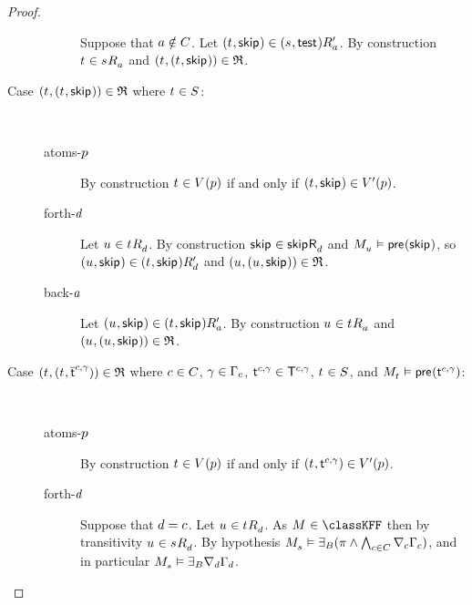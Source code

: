 \begin{proof}
\begin{description}
\begin{description}
                Suppose that $\agentA \notin \agentsC$.
                Let $(\kStateT, \aStateSkip) \in \kSuccessorsPA{(\kStateS, \aStateTest)}$.
                By construction $\kStateT \in \kSuccessorsA{\kStateS}$ and $(\kStateT, (\kStateT, \aStateSkip)) \in \refinement$.
        \end{description}
    \item[{Case $(\kStateT, (\kStateT, \aStateSkip)) \in \refinement$ where $\kStateT \in \kStates$:}] \hfill \\
        \begin{description}
            \item[atoms-$\atomP$]
                By construction $\kStateT \in \kValuation(\atomP)$ if and only if $(\kStateT, \aStateSkip) \in \kValuationP(\atomP)$.
            \item[forth-$\agentD$]
                Let $\kStateU \in \kSuccessorsD{\kStateT}$.
                By construction $\aStateSkip \in \aSuccessorsD{\aStateSkip}$ and $\kPModel{\kStateU} \entails \aPrecondition(\aStateSkip)$, so $(\kStateU, \aStateSkip) \in \kSuccessorsPD{(\kStateT, \aStateSkip)}$ and $(\kStateU, (\kStateU, \aStateSkip)) \in \refinement$.
            \item[back-$\agentA$]
                Let $(\kStateU, \aStateSkip) \in \kSuccessorsPA{(\kStateT, \aStateSkip)}$.
                By construction $\kStateU \in \kSuccessorsA{\kStateT}$ and $(\kStateU, (\kStateU, \aStateSkip)) \in \refinement$.
        \end{description}
    \item[{Case $(\kStateT, (\kStateT, \aPStateT[\agentC, \gamma])) \in \refinement$ where $\agentC \in \agentsC$, $\gamma \in \Gamma_\agentC$, $\aStateT[\agentC, \gamma] \in \aStatesT[\agentC, \gamma]$, $\kStateT \in \kStates$, and $\kPModel{\kStateT} \entails \aPrecondition(\aStateT[\agentC, \gamma])$:}] \hfill \\
        \begin{description}
            \item[atoms-$\atomP$]
                By construction $\kStateT \in \kValuation(\atomP)$ if and only if $(\kStateT, \aStateT[\agentC, \gamma]) \in \kValuationP(\atomP)$.
            \item[forth-$\agentD$]
                Suppose that $\agentD = \agentC$.
                Let $\kStateU \in \kSuccessorsD{\kStateT}$.
                As $\kModel \in \classKFF$ then by transitivity $\kStateU \in \kSuccessorsD{\kStateS}$.
                By hypothesis $\kPModel{\kStateS} \entails \someactsBs (\pi \land \bigwedge_{\agentC \in \agentsC} \coversC \Gamma_\agentC)$, and in particular $\kPModel{\kStateS} \entails \someactsBs \coversD \Gamma_\agentD$.

\end{description}
\end{description}
\end{proof}
